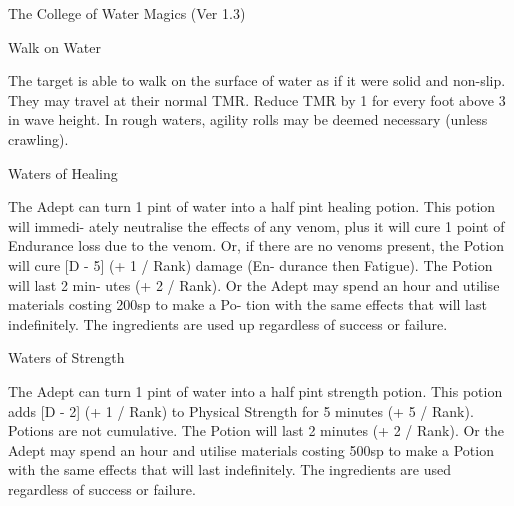 \begin{Chapter}{The College of Water Magics (Ver 1.3)}
\begin{spell}[S-10]{Walk on Water }
\begin{effects}
The target is able to walk on the surface of 
water  as  if  it  were  solid  and  non-slip.  They  may 
travel at their normal TMR. Reduce TMR by 1 for 
every foot above 3 in wave height. In rough waters, 
agility  rolls  may  be  deemed  necessary  (unless 
crawling). 



\end{effects}
\end{spell}

\begin{spell}[S-11]{Waters of Healing }

\begin{effects}
 The  Adept  can  turn 1  pint  of  water  into  a 
half  pint  healing  potion.  This  potion  will  immedi-
ately  neutralise  the  effects  of  any  venom,  plus  it 
will  cure  1  point  of  Endurance  loss  due  to  the 
venom.  Or,  if  there  are  no  venoms  present,  the 
Potion will cure [D - 5] (+ 1 / Rank) damage (En-
durance  then  Fatigue).  The  Potion  will  last  2  min-
utes (+ 2 / Rank). Or the Adept may spend an hour 
and  utilise  materials  costing  200sp  to  make  a  Po-
tion with the same effects that will last indefinitely. 
The  ingredients  are  used  up  regardless  of  success 
or failure. 

\end{effects}
\end{spell}

\begin{spell}[S-12]{Waters of Strength }

\begin{effects}
 The  Adept  can  turn 1  pint  of  water  into  a 
half  pint  strength potion.  This  potion  adds  [D  -  2] 
(+ 1 / Rank) to Physical Strength for 5 minutes (+ 5 
/  Rank).  Potions  are  not  cumulative.  The  Potion 
will last 2 minutes (+ 2 / Rank). Or the Adept may 
spend  an  hour  and  utilise  materials  costing  500sp 
to make a Potion with the same effects that will last 
indefinitely. The ingredients are used regardless of 
success or failure. 


\end{effects}
\end{spell}
\end{Chapter}
